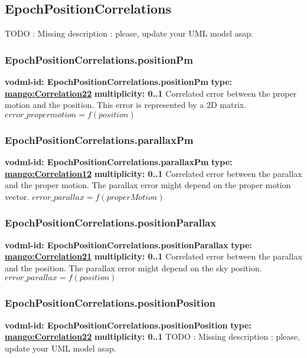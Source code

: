  \subsection{EpochPositionCorrelations}
  \label{sect:EpochPositionCorrelations}
    TODO : Missing description : please, update your UML model asap.

    \subsubsection{EpochPositionCorrelations.positionPm}
      \textbf{vodml-id: EpochPositionCorrelations.positionPm} \newline
      \textbf{type: \hyperref[sect:Correlation22]{mango:Correlation22}} \newline
      \textbf{multiplicity: 0..1} \newline 
      Correlated error between the proper motion and the position. This error is represented by a 2D matrix. $error\_{propermotion} = f(position)$

    \subsubsection{EpochPositionCorrelations.parallaxPm}
      \textbf{vodml-id: EpochPositionCorrelations.parallaxPm} \newline
      \textbf{type: \hyperref[sect:Correlation12]{mango:Correlation12}} \newline
      \textbf{multiplicity: 0..1} \newline 
      Correlated error between the parallax and the proper motion. The parallax error might depend on the proper motion vector. $error\_{parallax} = f(properMotion)$

    \subsubsection{EpochPositionCorrelations.positionParallax}
      \textbf{vodml-id: EpochPositionCorrelations.positionParallax} \newline
      \textbf{type: \hyperref[sect:Correlation21]{mango:Correlation21}} \newline
      \textbf{multiplicity: 0..1} \newline 
      Correlated error between the parallax and the position. The parallax error might depend on the sky position. $error\_{parallax} = f(position)$

    \subsubsection{EpochPositionCorrelations.positionPosition}
      \textbf{vodml-id: EpochPositionCorrelations.positionPosition} \newline
      \textbf{type: \hyperref[sect:Correlation22]{mango:Correlation22}} \newline
      \textbf{multiplicity: 0..1} \newline 
      TODO : Missing description : please, update your UML model asap.

